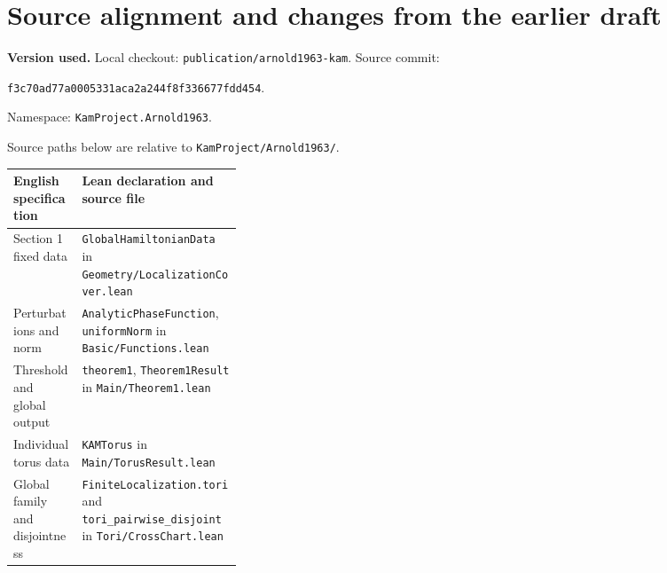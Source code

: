 \documentclass[11pt,a4paper]{article}
\newcommand{\code}[1]{\texttt{\small #1}}
\begin{document}
\newpage
\section{Source alignment and changes from the earlier draft}\label{sec:alignment}

\textbf{Version used.} Local checkout: \code{publication/arnold1963-kam}.
Source commit:
\begin{center}
\code{f3c70ad77a0005331aca2a244f8f336677fdd454}.
\end{center}
Namespace: \code{KamProject.Arnold1963}.\par
Source paths below are relative to \code{KamProject/Arnold1963/}.

\begin{center}
\small
\begin{tabularx}{\linewidth}{@{}>{\raggedright\arraybackslash}p{0.30\linewidth}>{\raggedright\arraybackslash}X@{}}
\toprule
English specification & Lean declaration and source file\\
\midrule
Section 1 fixed data & \code{GlobalHamiltonianData} in
\code{Geometry/LocalizationCover.lean}\\[4pt]
Perturbations and norm & \code{AnalyticPhaseFunction}, \code{uniformNorm} in
\code{Basic/Functions.lean}\\[4pt]
Threshold and global output & \code{theorem1}, \code{Theorem1Result} in
\code{Main/Theorem1.lean}\\[4pt]
Individual torus data & \code{KAMTorus} in \code{Main/TorusResult.lean}\\[4pt]
Global family and disjointness & \code{FiniteLocalization.tori} and
\code{tori\_pairwise\_disjoint} in \code{Tori/CrossChart.lean}\\
\bottomrule
\end{tabularx}
\end{center}
\end{document}
